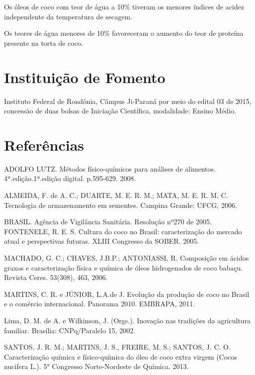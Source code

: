\documentclass[article,12pt,onesidea,4paper,english,brazil]{abntex2}
\begin{document}
Os óleos de coco com teor de água a 10\% tiveram os menores índices de acidez independente da temperatura de secagem.

Os teores de água menores de 10\% favoreceram o aumento do teor de proteína presente na torta de coco.
	
	\section*{Instituição de Fomento}
	
	Instituto Federal de Rondônia, Câmpus Ji-Paraná por meio do edital 03 de 2015, concessão de duas bolsas de Iniciação Científica, modalidade: Ensino Médio.
	
	\section*{Referências}
	
	\sloppy
	
\noindent ADOLFO LUTZ. Métodos físico-químicos para análises de alimentos. 4ª.edição.1ª.edição digital. p.595-629. 2008.

\noindent ALMEIDA, F. de A. C.; DUARTE, M. E. R. M.; MATA, M. E. R. M. C. Tecnologia de
armazenamento em sementes. Campina Grande: UFCG, 2006.

\noindent BRASIL. Agência de Vigilância Sanitária. Resolução nº270 de 2005.
FONTENELE, R. E. S. Cultura do coco no Brasil: caracterização do mercado atual e perspectivas futuras. XLIII Congresso da SOBER. 2005.

\noindent MACHADO, G. C.; CHAVES, J.B.P.; ANTONIASSI, R. Composição em ácidos
graxos e caracterização física e química de óleos hidrogenados de coco babaçu. Revista Ceres. 53(308), 463, 2006.

\noindent MARTINS, C. R. e JÚNIOR, L.A.de J. Evolução da produção de coco no Brasil e o comércio internacional. Panorama 2010. EMBRAPA, 2011.

\noindent Lima, D. M. de A. e Wilkinson, J. (Orgs.). Inovação nas tradições da agricultura familiar. Brasília: CNPq/Paralelo 15, 2002.

\noindent SANTOS, J. R. M.; MARTINS, J. S., FREIRE, M. S.; SANTOS, J. C. O.
Caracterização química e físico-química do óleo de coco extra virgem (Cocos nucifera L.). 5° Congresso Norte-Nordeste de Química. 2013.
	
\end{document}
